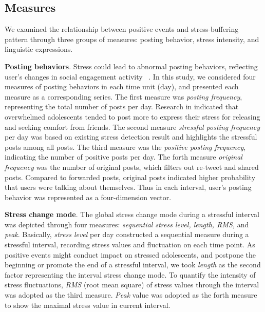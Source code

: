 \subsection{Measures}
\label{measures}
We examined the relationship
between positive events and stress-buffering pattern through three groups of measures:
posting behavior, stress intensity, and linguistic expressions.

\textbf{Posting behaviors}.
Stress could lead to abnormal posting behaviors,
reflecting user's changes in social engagement activity ~\citep{Liang2015Teenagers}.
In this study,
we considered four measures of posting behaviors in each time unit (day),
and presented each measure as a corresponding series.
The first measure was \emph{posting frequency},
representing the total number of posts per day.
Research in \cite{Li2017Analyzing} indicated that overwhelmed adolescents tended to post more to express their stress for releasing
and seeking comfort from friends.
The second measure \emph{stressful posting frequency} per day
was based on existing stress detection result and highlights the stressful posts among all posts.
The third measure was the \emph{positive posting frequency}, indicating the number of positive posts per day.
The forth measure \emph{original frequency} was the number of original posts, which filters out re-tweet and shared posts.
Compared to forwarded posts, original posts indicated higher probability that users were talking about themselves.
Thus in each interval, user's posting behavior was represented as a four-dimension vector.

\textbf{Stress change mode}.
The global stress change mode during a stressful interval was depicted through four measures:
\emph{sequential stress level, length, RMS,} and \emph{peak}.
Basically, \emph{stress level} per day constructed a sequential measure during a stressful interval,
recording stress values and fluctuation on each time point.
As positive events might conduct impact on stressed adolescents,
and postpone the beginning or promote the end of a stressful interval,
we took \emph{length} as the second factor representing the interval stress change mode.
To quantify the intensity of stress fluctuations,
\emph{RMS} (root mean square) of stress values through the interval was adopted  as the third measure.
\emph{Peak} value was adopted as the forth measure to show the maximal stress value in current interval.

